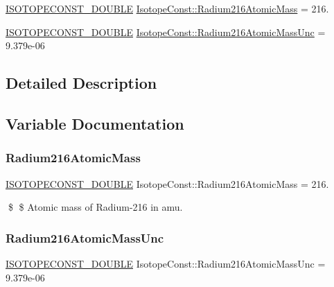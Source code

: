 \begin{DoxyCompactItemize}
\item 
\mbox{\hyperlink{group___isotope_const-_macros_ga8f45a7272ce02c0b4c65c44636ed719a}{I\+S\+O\+T\+O\+P\+E\+C\+O\+N\+S\+T\+\_\+\+D\+O\+U\+B\+LE}} \mbox{\hyperlink{group___isotope_const-_radium-_ra216_gae88737157c6f9048d44a18ae8c2d9298}{Isotope\+Const\+::\+Radium216\+Atomic\+Mass}} = 216.
\item 
\mbox{\hyperlink{group___isotope_const-_macros_ga8f45a7272ce02c0b4c65c44636ed719a}{I\+S\+O\+T\+O\+P\+E\+C\+O\+N\+S\+T\+\_\+\+D\+O\+U\+B\+LE}} \mbox{\hyperlink{group___isotope_const-_radium-_ra216_ga4e81d60fc233a5efd1e1b6495404044b}{Isotope\+Const\+::\+Radium216\+Atomic\+Mass\+Unc}} = 9.\+379e-\/06
\end{DoxyCompactItemize}


\subsection{Detailed Description}


\subsection{Variable Documentation}
\mbox{\label{group___isotope_const-_radium-_ra216_gae88737157c6f9048d44a18ae8c2d9298}} 
\subsubsection{\texorpdfstring{Radium216\+Atomic\+Mass}{Radium216AtomicMass}}
{\footnotesize\ttfamily \mbox{\hyperlink{group___isotope_const-_macros_ga8f45a7272ce02c0b4c65c44636ed719a}{I\+S\+O\+T\+O\+P\+E\+C\+O\+N\+S\+T\+\_\+\+D\+O\+U\+B\+LE}} Isotope\+Const\+::\+Radium216\+Atomic\+Mass = 216.}

\$ \$ Atomic mass of Radium-\/216 in amu. \mbox{\label{group___isotope_const-_radium-_ra216_ga4e81d60fc233a5efd1e1b6495404044b}} 
\subsubsection{\texorpdfstring{Radium216\+Atomic\+Mass\+Unc}{Radium216AtomicMassUnc}}
{\footnotesize\ttfamily \mbox{\hyperlink{group___isotope_const-_macros_ga8f45a7272ce02c0b4c65c44636ed719a}{I\+S\+O\+T\+O\+P\+E\+C\+O\+N\+S\+T\+\_\+\+D\+O\+U\+B\+LE}} Isotope\+Const\+::\+Radium216\+Atomic\+Mass\+Unc = 9.\+379e-\/06}

